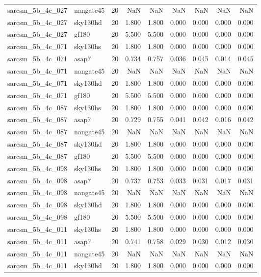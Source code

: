 \begin{tabular}{llrrrrrrr}
sarcsm\_5b\_4c\_027 & nangate45 & 20 & NaN & NaN & NaN & NaN & NaN & NaN \\
sarcsm\_5b\_4c\_027 & sky130hd & 20 & 1.800 & 1.800 & 0.000 & 0.000 & 0.000 & 0.000 \\
sarcsm\_5b\_4c\_027 & gf180 & 20 & 5.500 & 5.500 & 0.000 & 0.000 & 0.000 & 0.000 \\
sarcsm\_5b\_4c\_071 & sky130hs & 20 & 1.800 & 1.800 & 0.000 & 0.000 & 0.000 & 0.000 \\
sarcsm\_5b\_4c\_071 & asap7 & 20 & 0.734 & 0.757 & 0.036 & 0.045 & 0.014 & 0.045 \\
sarcsm\_5b\_4c\_071 & nangate45 & 20 & NaN & NaN & NaN & NaN & NaN & NaN \\
sarcsm\_5b\_4c\_071 & sky130hd & 20 & 1.800 & 1.800 & 0.000 & 0.000 & 0.000 & 0.000 \\
sarcsm\_5b\_4c\_071 & gf180 & 20 & 5.500 & 5.500 & 0.000 & 0.000 & 0.000 & 0.000 \\
sarcsm\_5b\_4c\_087 & sky130hs & 20 & 1.800 & 1.800 & 0.000 & 0.000 & 0.000 & 0.000 \\
sarcsm\_5b\_4c\_087 & asap7 & 20 & 0.729 & 0.755 & 0.041 & 0.042 & 0.016 & 0.042 \\
sarcsm\_5b\_4c\_087 & nangate45 & 20 & NaN & NaN & NaN & NaN & NaN & NaN \\
sarcsm\_5b\_4c\_087 & sky130hd & 20 & 1.800 & 1.800 & 0.000 & 0.000 & 0.000 & 0.000 \\
sarcsm\_5b\_4c\_087 & gf180 & 20 & 5.500 & 5.500 & 0.000 & 0.000 & 0.000 & 0.000 \\
sarcsm\_5b\_4c\_098 & sky130hs & 20 & 1.800 & 1.800 & 0.000 & 0.000 & 0.000 & 0.000 \\
sarcsm\_5b\_4c\_098 & asap7 & 20 & 0.737 & 0.753 & 0.033 & 0.031 & 0.017 & 0.031 \\
sarcsm\_5b\_4c\_098 & nangate45 & 20 & NaN & NaN & NaN & NaN & NaN & NaN \\
sarcsm\_5b\_4c\_098 & sky130hd & 20 & 1.800 & 1.800 & 0.000 & 0.000 & 0.000 & 0.000 \\
sarcsm\_5b\_4c\_098 & gf180 & 20 & 5.500 & 5.500 & 0.000 & 0.000 & 0.000 & 0.000 \\
sarcsm\_5b\_4c\_011 & sky130hs & 20 & 1.800 & 1.800 & 0.000 & 0.000 & 0.000 & 0.000 \\
sarcsm\_5b\_4c\_011 & asap7 & 20 & 0.741 & 0.758 & 0.029 & 0.030 & 0.012 & 0.030 \\
sarcsm\_5b\_4c\_011 & nangate45 & 20 & NaN & NaN & NaN & NaN & NaN & NaN \\
sarcsm\_5b\_4c\_011 & sky130hd & 20 & 1.800 & 1.800 & 0.000 & 0.000 & 0.000 & 0.000 \\

\end{tabular}
